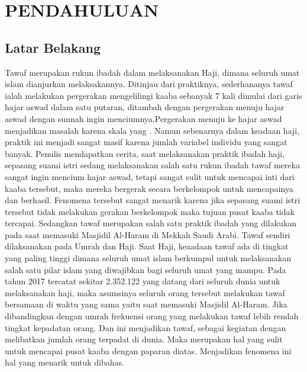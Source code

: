 %
\chapter{PENDAHULUAN}\label{cha:pendahuluan}
\section{Latar Belakang}\label{sec:latar}

\hspace{0.6cm} Tawaf merupakan rukun ibadah dalam melaksanakan Haji, dimana seluruh umat islam dianjurkan melaksakannya. Ditinjau dari praktiknya, sederhananya tawaf ialah melakukan pergerakan mengelilingi kaaba sebanyak 7 kali dimulai dari garis hajar aswad dalam satu putaran, ditambah dengan pergerakan menuju hajar aswad dengan sunnah ingin menciumnya.Pergerakan menuju ke hajar aswad menjadikan masalah karena skala yang . Namun sebenarnya dalam keadaan haji, praktik ini menjadi sangat masif karena jumlah variabel individu yang sangat banyak. Penulis mendapatkan cerita, saat melaksanakan praktik ibadah haji, sepasang suami istri sedang melaksanakan salah satu rukun ibadah tawaf mereka sangat ingin mencium hajar aswad, tetapi sangat sulit untuk mencapai inti dari kaaba tersebut, maka mereka bergerak secara berkelompok untuk mencapainya dan berhasil. Fenomena  tersebut sangat menarik karena jika sepasang suami istri tersebut tidak melakukan gerakan berkelompok maka tujuan pusat kaaba tidak tercapai. Sedangkan tawaf merupakan salah satu praktik ibadah yang dilakukan pada saat memasuki Masjidil Al-Haram di Mekkah Saudi Arabi. Tawaf sendiri dilaksanakan pada Umrah dan Haji. Saat Haji, keaadaan tawaf ada di tingkat yang paling tinggi dimana seluruh umat islam berkumpul untuk melaksanakan salah satu pilar islam yang diwajibkan bagi seluruh umat yang mampu. Pada tahun 2017 tercatat sekitar 2.352.122 yang datang dari seluruh dunia untuk melaksanakan haji\citep{Saudi2017}, maka asumsinya seluruh orang tersebut melakukan tawaf bersamaan di waktu yang sama yaitu saat memasuki Masjidil Al-Haram. Jika dibandingkan dengan umrah frekuensi orang yang melakukan tawaf lebih rendah tingkat kepadatan orang. Dan ini menjadikan tawaf, sebagai kegiatan dengan melibatkan jumlah orang terpadat di dunia. Maka merupakan hal yang sulit untuk mencapai pusat kaaba dengan paparan diatas. Menjadikan fenomena ini hal yang menarik untuk dibahas.

